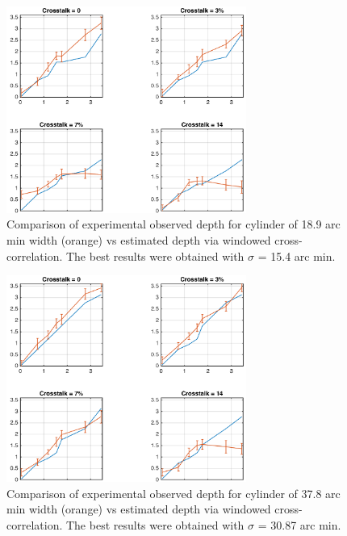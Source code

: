 \begin{figure}[H]
\centering
    \includegraphics[width=0.7\textwidth]{./Template_Figures/s_9_sigma_7_4}
    \caption{Comparison of experimental observed depth for cylinder of 18.9 arc min width (orange) vs estimated depth via windowed cross-correlation. The best results were obtained with $\sigma$ = 15.4 arc min.\label{fig:s_9_sigma_7_4}}
\end{figure}
\begin{figure}[H]
\centering
    \includegraphics[width=0.7\textwidth]{./Template_Figures/s_18_sigma_14_7}
    \caption{Comparison of experimental observed depth for cylinder of 37.8 arc min width (orange) vs estimated depth via windowed cross-correlation. The best results were obtained with $\sigma$ = 30.87 arc min.\label{fig:s_18_sigma_14_7}}
\end{figure}
